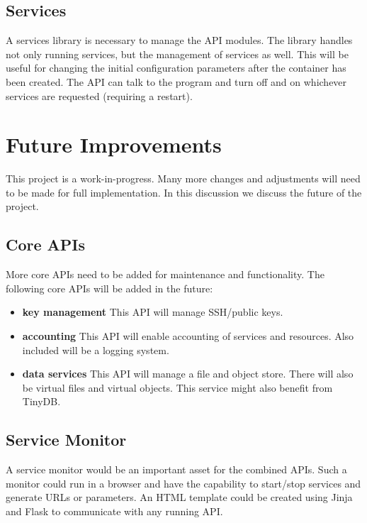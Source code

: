 \subsection{Services}

A services library is necessary to manage the API modules. The library handles
not only running services, but the management of services as well. This
will be useful for changing the initial configuration parameters after the
container has been created. The API can talk to the program and turn off
and on whichever services are requested (requiring a restart).

\section{Future Improvements}

This project is a work-in-progress. Many more changes and adjustments will
need to be made for full implementation. In this discussion we discuss the
future of the project.

\subsection{Core APIs}

More core APIs need to be added for maintenance and functionality. The
following core APIs will be added in the future:
\begin{itemize}
    \item \textbf{key management} This API will manage SSH/public keys.
    \item \textbf{accounting} This API will enable accounting of services
    and resources. Also included will be a logging system.
    \item \textbf{data services} This API will manage a file and object
    store. There will also be virtual files and virtual objects. This service
    might also benefit from TinyDB.
\end{itemize}

\subsection{Service Monitor}

A service monitor would be an important asset for the combined APIs. Such a
monitor could run in a browser and have the capability to start/stop services
and generate URLs or parameters. An HTML template could be created using
Jinja and Flask to communicate with any running API.


